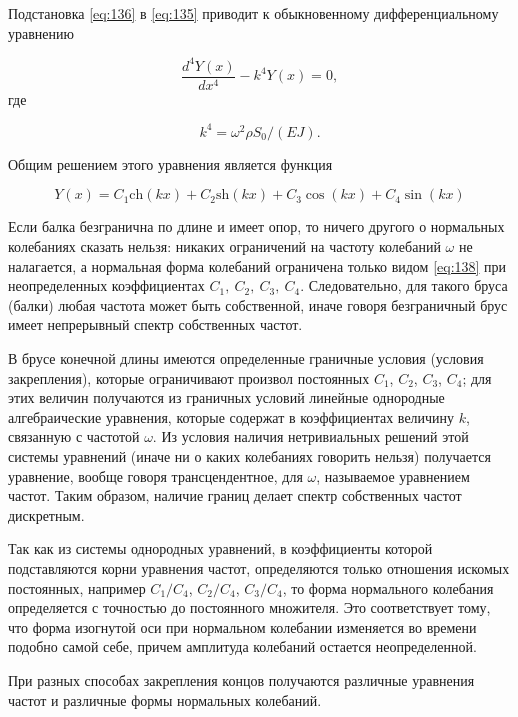 \documentclass[specialist, subf, href, colorlinks=true, 14pt, final]{disser}
\theoremstyle{definition}
\begin{document}
Подстановка \eqref{eq:136} в \eqref{eq:135} приводит к обыкновенному дифференциальному уравнению
\addtocounter{equation}{1}
\begin{equation}\label{eq:137}
  \frac{d^{4}Y(x)}{dx^4} - k^{4}Y(x) = 0,
  \tag{7}
\end{equation}
где
\addtocounter{equation}{1}
\begin{equation}\label{eq:13star}
  k^{4} = \omega^{2}\rho S_{0} / (EJ).
  \tag{*}
\end{equation}

Общим решением этого уравнения является функция
\addtocounter{equation}{1}
\begin{equation}\label{eq:138}
  Y(x) = C_{1}\text{ch}(kx) + C_{2}\text{sh}(kx) + C_{3}\cos (kx) + C_{4}\sin (kx)
  \tag{8}
\end{equation}

Если балка безгранична по длине и имеет опор, то ничего другого о нормальных колебаниях сказать нельзя: никаких ограничений на частоту колебаний $\omega$ не налагается, а нормальная форма колебаний ограничена только видом \eqref{eq:138} при неопределенных коэффициентах $C_{1},\ C_{2},\ C_{3},\ C_{4}$. Следовательно, для такого бруса (балки) любая частота может быть собственной, иначе говоря безграничный брус имеет непрерывный спектр собственных частот.

В брусе конечной длины имеются определенные граничные условия (условия закрепления), которые ограничивают произвол постоянных $C_{1}$, $C_{2}$, $C_{3}$, $C_{4}$; для этих величин получаются из граничных условий линейные однородные алгебраические уравнения, которые содержат в коэффициентах величину $k$, связанную с частотой $\omega$. Из условия наличия нетривиальных решений этой системы уравнений (иначе ни о каких колебаниях говорить нельзя) получается уравнение, вообще говоря трансцендентное, для $\omega$, называемое уравнением частот. Таким образом, наличие границ делает спектр собственных частот дискретным.

Так как из системы однородных уравнений, в коэффициенты которой подставляются корни уравнения частот, определяются только отношения искомых постоянных, например $C_{1} / C_{4}$, $C_{2} / C_{4}$, $C_{3} / C_{4}$, то форма нормального колебания определяется с точностью
до постоянного множителя. Это соответствует тому, что форма изогнутой оси при нормальном колебании изменяется во времени подобно самой себе, причем амплитуда колебаний остается неопределенной.

При разных способах закрепления концов получаются различные уравнения частот и различные формы нормальных колебаний.
\end{document}
